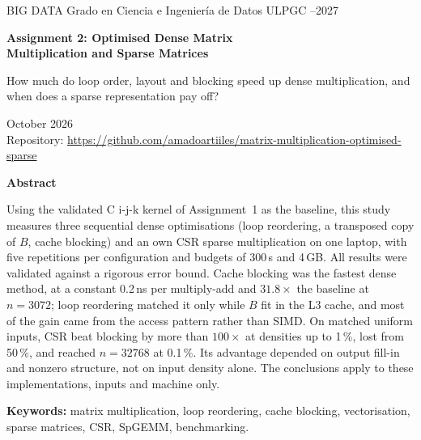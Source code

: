 \documentclass[11pt,a4paper]{article}
\newcommand{\AuthorName}{Amado Artiles Rodríguez}
\newcommand{\RepoURL}{https://github.com/amadoartiiles/matrix-multiplication-optimised-sparse}
\begin{document}
\thispagestyle{empty}
\begin{tcolorbox}[enhanced,colback=accent,colframe=accent,coltext=white,arc=3pt,
  left=14pt,right=14pt,top=12pt,bottom=12pt]
{\small BIG DATA \quad\textperiodcentered\quad Grado en Ciencia e Ingeniería de Datos \quad\textperiodcentered\quad ULPGC \quad\textperiodcentered{}--2027}

\vspace{8pt}
{\LARGE\bfseries Assignment 2: Optimised Dense Matrix\\[2pt] Multiplication and Sparse Matrices}

\vspace{8pt}
{\large How much do loop order, layout and blocking speed up dense multiplication, and when does a
sparse representation pay off?}
\end{tcolorbox}

\vspace{4pt}
\noindent{\large\bfseries \AuthorName}\hfill{\color{codecomment}October 2026}\\
{\small Repository: \url{\RepoURL}}

\vspace{6pt}
\begin{infobox}
{\color{accent}\bfseries Abstract}\par\vspace{3pt}
Using the validated C i-j-k kernel of Assignment~1 as the baseline, this study measures three
sequential dense optimisations (loop reordering, a transposed copy of $B$, cache blocking) and an
own CSR sparse multiplication on one laptop, with five repetitions per configuration and budgets
of 300\,s and 4\,GB. All results were validated against a rigorous error bound. Cache blocking
was the fastest dense method, at a constant 0.2\,ns per multiply-add and $31.8\times$ the
baseline at $n=3072$; loop reordering matched it only while $B$ fit in the L3 cache, and most
of the gain came from the access pattern rather than SIMD. On matched uniform inputs, CSR beat
blocking by more than $100\times$ at densities up to 1\,\%, lost from 50\,\%, and reached
$n=32768$ at 0.1\,\%. Its advantage depended on output fill-in and nonzero structure, not on
input density alone. The conclusions apply to these implementations, inputs and machine only.

\vspace{4pt}
{\small\textbf{Keywords:} matrix multiplication, loop reordering, cache blocking, vectorisation,
sparse matrices, CSR, SpGEMM, benchmarking.}
\end{infobox}
\end{document}
